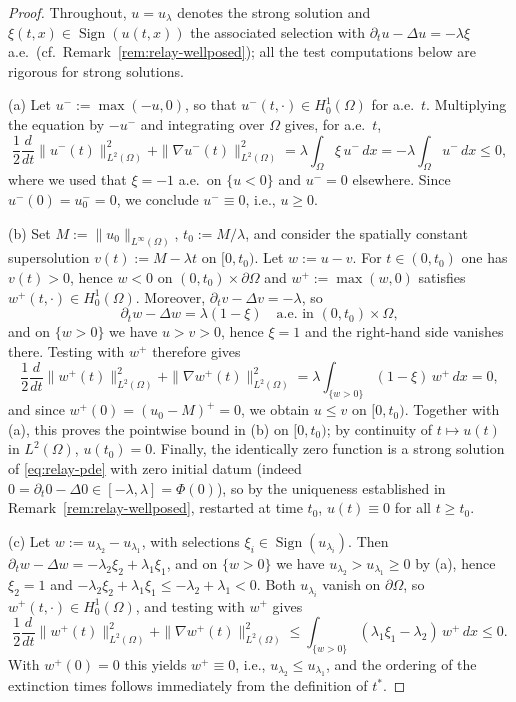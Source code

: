 \documentclass[11pt]{elsarticle}
\theoremstyle{definition}
\theoremstyle{remark}
\numberwithin{equation}{section}
\DeclareMathOperator{\Sign}{Sign}
\begin{document}
\begin{proof}
	Throughout, $u=u_\lambda$ denotes the strong solution and
	$\xi(t,x)\in\Sign(u(t,x))$ the associated selection with
	$\partial_tu-\Delta u=-\lambda\xi$ a.e.\ (cf.\
	Remark~\ref{rem:relay-wellposed}); all the test computations below are
	rigorous for strong solutions.
	
	(a) Let $u^-:=\max(-u,0)$, so that $u^-(t,\cdot)\in H_0^1(\Omega)$ for
	a.e.\ $t$. Multiplying the equation by $-u^-$ and integrating over
	$\Omega$ gives, for a.e.\ $t$,
	\[
	\frac12\frac{d}{dt}\|u^-(t)\|_{L^2(\Omega)}^2
	+\|\nabla u^-(t)\|_{L^2(\Omega)}^2
	=\lambda\int_\Omega\xi\,u^-\,dx
	=-\lambda\int_\Omega u^-\,dx\le0,
	\]
	where we used that $\xi=-1$ a.e.\ on $\{u<0\}$ and $u^-=0$ elsewhere.
	Since $u^-(0)=u_0^-=0$, we conclude $u^-\equiv0$, i.e., $u\ge0$.
	
	(b) Set $M:=\|u_0\|_{L^\infty(\Omega)}$, $t_0:=M/\lambda$, and
	consider the spatially constant supersolution
	$v(t):=M-\lambda t$ on $[0,t_0)$. Let $w:=u-v$. For $t\in(0,t_0)$ one
	has $v(t)>0$, hence $w<0$ on $(0,t_0)\times\partial\Omega$ and
	$w^+:=\max(w,0)$ satisfies $w^+(t,\cdot)\in H_0^1(\Omega)$. Moreover,
	$\partial_tv-\Delta v=-\lambda$, so
	\[
	\partial_tw-\Delta w=\lambda(1-\xi)
	\quad\text{a.e.\ in }(0,t_0)\times\Omega,
	\]
	and on $\{w>0\}$ we have $u>v>0$, hence $\xi=1$ and the right-hand
	side vanishes there. Testing with $w^+$ therefore gives
	\[
	\frac12\frac{d}{dt}\|w^+(t)\|_{L^2(\Omega)}^2
	+\|\nabla w^+(t)\|_{L^2(\Omega)}^2
	=\lambda\int_{\{w>0\}}(1-\xi)\,w^+\,dx=0,
	\]
	and since $w^+(0)=(u_0-M)^+=0$, we obtain $u\le v$ on $[0,t_0)$.
	Together with (a), this proves the pointwise bound in (b) on
	$[0,t_0)$; by continuity of $t\mapsto u(t)$ in $L^2(\Omega)$,
	$u(t_0)=0$. Finally, the identically zero function is a strong
	solution of \eqref{eq:relay-pde} with zero initial datum
	(indeed $0=\partial_t0-\Delta 0\in[-\lambda,\lambda]=\Phi(0)$), so by
	the uniqueness established in Remark~\ref{rem:relay-wellposed},
	restarted at time $t_0$, $u(t)\equiv0$ for all $t\ge t_0$.
	
	(c) Let $w:=u_{\lambda_2}-u_{\lambda_1}$, with selections
	$\xi_i\in\Sign(u_{\lambda_i})$. Then
	$\partial_tw-\Delta w=-\lambda_2\xi_2+\lambda_1\xi_1$, and on
	$\{w>0\}$ we have $u_{\lambda_2}>u_{\lambda_1}\ge0$ by (a), hence
	$\xi_2=1$ and
	$-\lambda_2\xi_2+\lambda_1\xi_1\le-\lambda_2+\lambda_1<0$. Both
	$u_{\lambda_i}$ vanish on $\partial\Omega$, so
	$w^+(t,\cdot)\in H_0^1(\Omega)$, and testing with $w^+$ gives
	\[
	\frac12\frac{d}{dt}\|w^+(t)\|_{L^2(\Omega)}^2
	+\|\nabla w^+(t)\|_{L^2(\Omega)}^2
	\le\int_{\{w>0\}}(\lambda_1\xi_1-\lambda_2)\,w^+\,dx\le0 .
	\]
	With $w^+(0)=0$ this yields $w^+\equiv0$, i.e.,
	$u_{\lambda_2}\le u_{\lambda_1}$, and the ordering of the extinction
	times follows immediately from the definition of $t^*$.
\end{proof}
\end{document}
